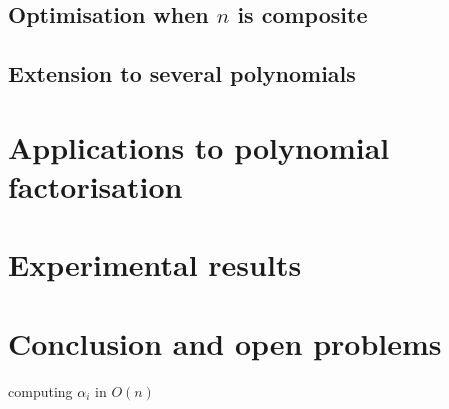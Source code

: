 \documentclass{sig-alternate}
\begin{document}
\subsection{Optimisation when $n$ is composite}

\subsection{Extension to several polynomials}



\section{Applications to polynomial factorisation}
\label{sec:factorization}

\section{Experimental results}

\section{Conclusion and open problems}

computing $\alpha_i$ in $O(n)$




\end{document}
